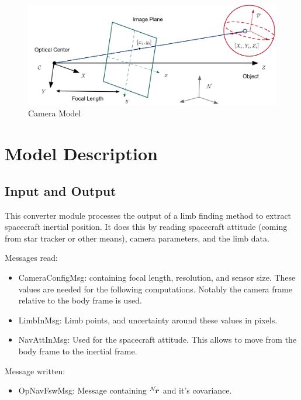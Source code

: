 

\begin{figure}[H]
	\centerline{
		\includegraphics{Figures/CameraGeometry}
	}
	\caption{Camera Model}
	\label{fig:camera}
\end{figure}

\section{Model Description}

\subsection{Input and Output}

This converter module processes the output of a limb finding method to extract spacecraft inertial position. It does this by reading spacecraft attitude (coming from star tracker or other means), camera parameters, and the limb data. 

Messages read:

\begin{itemize}
\item CameraConfigMsg: containing focal length, resolution, and sensor size. These values are needed for the following computations. Notably the camera frame relative to the body frame is used.
\item LimbInMsg: Limb points, and uncertainty around these values in pixels. 
\item NavAttInMsg: Used for the spacecraft attitude. This allows to move from the body frame to the inertial frame.
\end{itemize}

Message written:
\begin{itemize}
\item OpNavFswMsg: Message containing $\leftexp{N}{\bm r}$ and it's covariance.
\end{itemize}

